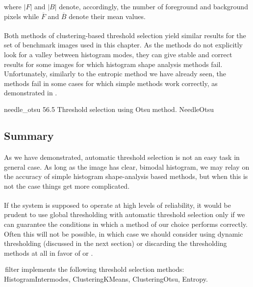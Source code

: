 where $|F|$ and $|B|$ denote, accordingly, the number of foreground and background pixels while $\overline{F}$ and $\overline{B}$ denote their mean values.

\paragraph*{}
Both methods of clustering-based threshold selection yield similar results for the set of benchmark images used in this chapter. As the methods do not explicitly look for a valley between histogram modes, they can give stable and correct results for some images for which histogram shape analysis methods fail. Unfortunately, similarly to the entropic method we have already seen, the methods fail in some cases for which simple methods work correctly, as demonstrated in .

\thresholdFigure
{needle_otsu}
{56.5}
{Threshold selection using Otsu method.}
{NeedleOtsu}

\subsection{Summary}

\paragraph*{}
As we have demonstrated, automatic threshold selection is not an easy task in general case. As long as the image has clear, bimodal histogram, we may relay on the accuracy of simple histogram shape-analysis based methods, but when this is not the case things get more complicated. 

\paragraph*{}
If the system is supposed to operate at high levels of reliability, it would be prudent to use global thresholding with automatic threshold selection only if we can guarantee the conditions in which a method of our choice performs correctly. Often this will not be possible, in which case we should consider using dynamic thresholding (discussed in the next section) or discarding the thresholding methods at all in favor of  or .

\begin{refImpl}
\studio \,filter  implements the following threshold selection methods: HistogramIntermodes, ClusteringKMeans, ClusteringOtsu, Entropy. 
\end{refImpl}
